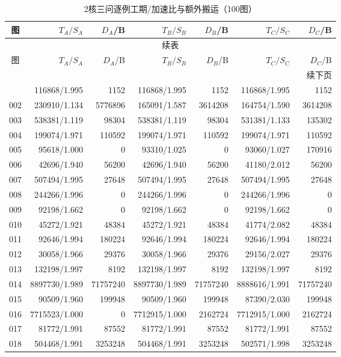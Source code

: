 \begin{longtable}{crrrrrr}
\caption{2核三问逐例工期/加速比与额外搬运（100图）}\label{tab:detail-2}\\
\toprule
图 & $T_A/S_A$ & $D_A$/B & $T_B/S_B$ & $D_B$/B & $T_C/S_C$ & $D_C$/B \\
\midrule
\endfirsthead
\multicolumn{7}{c}{续表}\\
\toprule
图 & $T_A/S_A$ & $D_A$/B & $T_B/S_B$ & $D_B$/B & $T_C/S_C$ & $D_C$/B \\
\midrule
\endhead
\midrule\multicolumn{7}{r}{续下页}\\
\endfoot
\bottomrule
\endlastfoot
001 & 116868/1.995 & 1152 & 116868/1.995 & 1152 & 116868/1.995 & 1152 \\
002 & 230910/1.134 & 5776896 & 165091/1.587 & 3614208 & 164754/1.590 & 3614208 \\
003 & 538381/1.119 & 98304 & 538381/1.119 & 98304 & 531381/1.133 & 135302 \\
004 & 199074/1.971 & 110592 & 199074/1.971 & 110592 & 199074/1.971 & 110592 \\
005 & 95618/1.000 & 0 & 93310/1.025 & 0 & 93060/1.027 & 170916 \\
006 & 42696/1.940 & 56200 & 42696/1.940 & 56200 & 41180/2.012 & 56200 \\
007 & 507494/1.995 & 27648 & 507494/1.995 & 27648 & 507494/1.995 & 27648 \\
008 & 244266/1.996 & 0 & 244266/1.996 & 0 & 244266/1.996 & 0 \\
009 & 92198/1.662 & 0 & 92198/1.662 & 0 & 92198/1.662 & 0 \\
010 & 45272/1.921 & 48384 & 45272/1.921 & 48384 & 41774/2.082 & 48384 \\
011 & 92646/1.994 & 180224 & 92646/1.994 & 180224 & 92646/1.994 & 180224 \\
012 & 30058/1.966 & 29376 & 30058/1.966 & 29376 & 29156/2.027 & 29376 \\
013 & 132198/1.997 & 8192 & 132198/1.997 & 8192 & 132198/1.997 & 8192 \\
014 & 8897730/1.989 & 71757240 & 8897730/1.989 & 71757240 & 8888616/1.991 & 71757240 \\
015 & 90509/1.960 & 199948 & 90509/1.960 & 199948 & 87390/2.030 & 199948 \\
016 & 7715523/1.000 & 0 & 7712915/1.000 & 2162724 & 7712915/1.000 & 2162724 \\
017 & 81772/1.991 & 87552 & 81772/1.991 & 87552 & 81772/1.991 & 87552 \\
018 & 504468/1.991 & 3253248 & 504468/1.991 & 3253248 & 502571/1.998 & 3253248 \\

\end{longtable}
